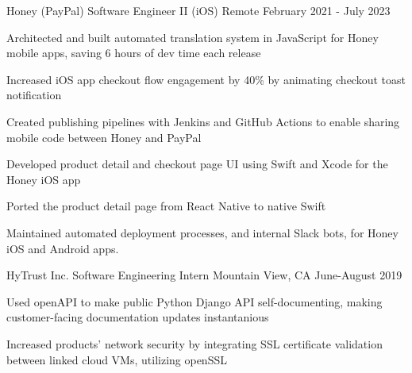 \documentclass[11pt, a4paper]{awesome-cv}
\begin{document}
\begin{cventries}
  \cventry
    {Honey (PayPal)}
    {Software Engineer II (iOS)}
    {Remote}
    {February 2021 - July 2023}
    {
        \begin{cvitems}
            \item {Architected and built automated translation system in JavaScript for Honey mobile apps, saving 6 hours of dev time each release}
            \item {Increased iOS app checkout flow engagement by 40\% by animating checkout toast notification}
            \item {Created publishing pipelines with Jenkins and GitHub Actions to enable sharing mobile code between Honey and PayPal}
            \item {Developed product detail and checkout page UI using Swift and Xcode for the Honey iOS app}
            \item {Ported the product detail page from React Native to native Swift}
            \item {Maintained automated deployment processes, and internal Slack bots, for Honey iOS and Android apps.}
        \end{cvitems}
    }


  \cventry
    {HyTrust Inc.}
    {Software Engineering Intern}
    {Mountain View, CA}
    {June-August 2019}
    {
      \begin{cvitems}
      	\item {Used openAPI to make public Python Django API self-documenting, making customer-facing documentation updates instantanious}
	      \item {Increased products' network security by integrating SSL certificate validation between linked cloud VMs, utilizing openSSL}
      \end{cvitems}
    }


\end{cventries}
\end{document}
